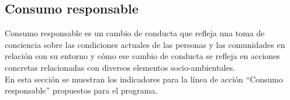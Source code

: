 
\subsection{Consumo responsable}

	Consumo responsable es un cambio de conducta que refleja una toma de conciencia sobre las condiciones actuales de las personas 
	y las comunidades en relación con su entorno y cómo ese cambio de conducta se refleja en acciones concretas relacionadas con diversos elementos socio-ambientales.\\

	En esta sección se muestran los indicadores para la línea de acción ``Consumo responsable'' propuestos para el programa.

